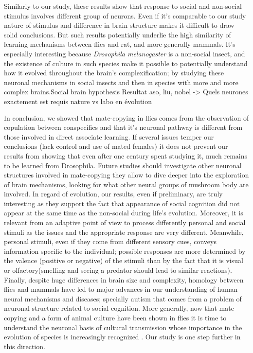 \documentclass[a4paper, 12pt]{article}
\begin{document}
Similarly to our study, these results show that response to social and non-social stimulus involves different group of neurons. Even if it's comparable to our study nature of stimulus and difference in brain structure makes it difficult to draw solid conclusions. But such results potentially underlie the high similarity of learning mechanisms between flies and rat, and more generally mammals. It's especially interesting because \textit{Drosophila melanogaster} is a non-social insect, and the existence of culture in such species make it possible to potentially understand how it evolved throughout the brain's complexification; by studying these neuronal mechanisms in social insects and then in species with more and more complex brains.Social brain hypothesis
Resultat  aso, liu, nobel -> Quels neurones exactement est requis
nature vs labo en évolution

In conclusion, we showed that mate-copying in flies comes from the observation of copulation between conspecifics and that it's neuronal pathway is different from those involved in direct associate learning. If several issues temper our conclusions (lack control and use of mated females) 
it does not prevent our results from showing that even after one century spent studying it, much remains to be learned from Drosophila. Future studies should investigate other neuronal structures involved in mate-copying
they allow to dive deeper into the exploration of brain mechanisms, looking for what other neural groups of mushroom body are involved.
In regard of evolution, our results, even if preliminary, are truly interesting as they support the fact that appearance of social cognition did not appear at the same time as the non-social  during life's evolution. 
Moreover, it is relevant from an adaptive point of view  to process differently personal and social stimuli as the issues and the appropriate response are very different. Meanwhile, personal stimuli, even if they come from different sensory cues, conveys information specific to the individual; possible responses are more determined by the valence (positive or negative) of the stimuli than by the fact that it is visual or olfactory(smelling and seeing a predator should lead to similar reactions).
Finally, despite huge differences in brain size and complexity, homology between flies and mammals have led to major advances in our understanding of human neural mechanisms and diseases; specially autism that comes from a problem of neuronal structure related to social cognition. 
More generally, now that mate-copying and a form of animal culture have been shown in flies it is time to understand the neuronal basis of cultural transmission whose importance in the evolution of species is increasingly recognized \parencite{danchin_public_2004}.
Our study is one step further in this direction. 










\clearpage
\newrefcontext[sorting=nyt] %
\printbibliography
 
\end{document}
